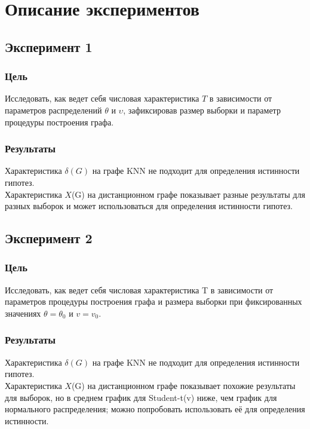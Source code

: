 \documentclass[a4paper, 12pt]{article}
\begin{document}
\section{Описание экспериментов}
\subsection{Эксперимент 1}
\subsubsection{Цель}
Исследовать, как ведет себя числовая характеристика $T$ в зависимости
от параметров распределений $θ$ и $υ$, зафиксировав размер выборки и
параметр процедуры построения графа.\\

\subsubsection{Результаты}
Характеристика $\delta(G)$ на графе KNN не подходит для определения истинности гипотез.\\
Характеристика $X$(G) на дистанционном графе показывает разные результаты для разных выборок и может использоваться для определения истинности гипотез.\\

\subsection{Эксперимент 2}
\subsubsection{Цель}
Исследовать, как ведет себя числовая характеристика T в зависимости
от параметров процедуры построения графа и размера выборки при
фиксированных значениях $\theta = \theta_0$ и $v = v_0$.\\

\subsubsection{Результаты}
Характеристика $\delta(G)$ на графе KNN не подходит для определения истинности гипотез.\\
Характеристика $X$(G) на дистанционном графе показывает похожие результаты для выборок, но в среднем график для Student-t(v) ниже, чем график для нормального распределения; можно попробовать использовать её для определения истинности.\\
\end{document}
